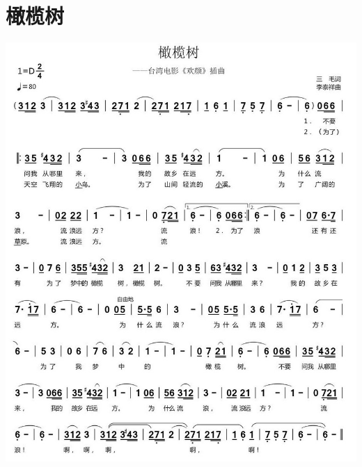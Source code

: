 \documentclass[cn,pad,twocol]{elegantbook}
\begin{document}
\section{橄榄树}\includegraphics[width=\textwidth]{rpi400/20210110-橄榄树.jpg}
\end{document}
